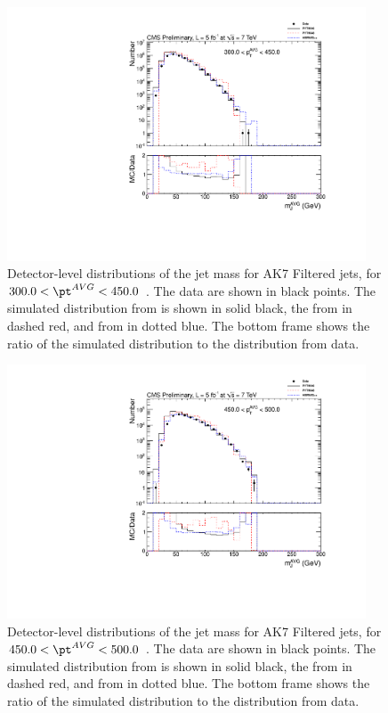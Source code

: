 \begin{figure}[htbp]
\centering
\includegraphics[width=0.95\textwidth]{figs/histAK7MjetVsPtAvg_rawDataMCComparisons_pt_5_Filtered}
\caption{Detector-level distributions of the jet mass for AK7 Filtered jets,
for $300.0 < \pt^{AVG} < 450.0$ \GeVc. The data are shown in black points.
The simulated distribution from \PYTHIA is shown in solid black, 
the from \PYTHIAEIGHT in dashed red, and from \HERWIG in dotted blue. 
The bottom frame shows the ratio of the simulated distribution
to the distribution from data. 
\label{figs:histAK7MjetVsPtAvg_rawDataMCComparisons_pt_5_Filtered}}
\end{figure}



\begin{figure}[htbp]
\centering
\includegraphics[width=0.95\textwidth]{figs/histAK7MjetVsPtAvg_rawDataMCComparisons_pt_6_Filtered}
\caption{Detector-level distributions of the jet mass for AK7 Filtered jets,
for $450.0 < \pt^{AVG} < 500.0$ \GeVc. The data are shown in black points.
The simulated distribution from \PYTHIA is shown in solid black, 
the from \PYTHIAEIGHT in dashed red, and from \HERWIG in dotted blue. 
The bottom frame shows the ratio of the simulated distribution
to the distribution from data. 
\label{figs:histAK7MjetVsPtAvg_rawDataMCComparisons_pt_6_Filtered}}
\end{figure}



